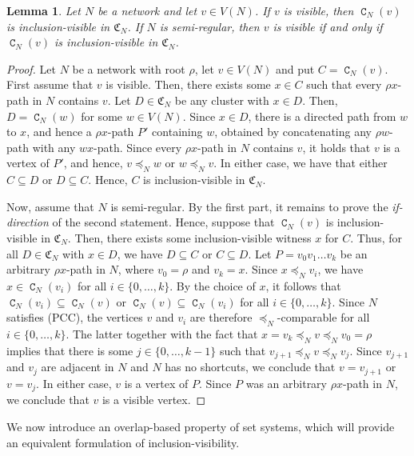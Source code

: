 \documentclass[preprint]{elsarticle}
\newtheorem{lemma}[theorem]{Lemma}
\newcommand{\CS}[1][]{\ensuremath{\mathfrak{C}_{#1}}}
\DeclareMathOperator{\CC}{\mathtt{C}}
\begin{document}
\begin{lemma}\label{lem:visible-semiregular}
    Let $N$ be a network and let $v\in V(N)$. If $v$ is visible, then
    $\CC_N(v)$ is inclusion-visible in $\CS[N]$. If $N$ is semi-regular, then $v$ is
    visible if and only if $\CC_N(v)$ is inclusion-visible in $\CS[N]$.
\end{lemma}
\begin{proof}
	Let $N$ be a network with root $\rho$, let $v\in V(N)$ and put $C=\CC_N(v)$. First assume that
	$v$ is visible.
	Then, there exists some $x\in C$ such that every $\rho x$-path in $N$ contains $v$. Let
	$D\in\CS[N]$ be any cluster with $x\in D$. Then, $D=\CC_N(w)$ for some $w\in V(N)$.
	Since $x\in D$, there is a
	directed path from $w$ to $x$, and hence a $\rho x$-path $P'$ containing $w$, obtained by
	concatenating any $\rho w$-path with any $wx$-path.
	Since every $\rho x$-path in $N$ contains $v$, it holds that $v$ is a vertex of $P'$, and
	hence, $v\preceq_N w$ or $w\preceq_N v$. In either case, we have that either $C\subseteq D$ or
	$D\subseteq C$. Hence, $C$ is inclusion-visible in $\CS[N]$.
	
	Now, assume that $N$ is semi-regular. By the first part, it remains to prove the
	\emph{if-direction} of the second statement.
 	Hence, suppose that $\CC_N(v)$ is inclusion-visible in $\CS[N]$. Then, there exists some
	inclusion-visible witness $x$ for $C$. Thus,
	for all $D\in\CS[N]$ with $x\in D$, we have $D\subseteq C$ or $C\subseteq D$.
	Let $P=v_0v_1\ldots v_k$ be an arbitrary $\rho x$-path in $N$, where $v_0=\rho$ and $v_k=x$.
	Since $x\preceq_N v_i$, we have  $x\in \CC_N(v_i)$ for all $i\in\{0,\ldots,k\}$. 
	By the choice of $x$, it follows that $\CC_N(v_i)\subseteq \CC_N(v)$ or
	$\CC_N(v)\subseteq \CC_N(v_i)$ for all $i\in\{0,\ldots,k\}$. Since $N$ satisfies 
	(PCC), the vertices $v$ and $v_i$ are therefore $\preceq_N$-comparable for all
	$i\in\{0,\ldots,k\}$. The latter together with the fact that $x=v_k\preceq_N v\preceq_N v_0=\rho$
	implies that there is some $j\in\{0,\ldots,k-1\}$ such that $v_{j+1}\preceq_N v\preceq_N v_j$.
	Since $v_{j+1}$ and $v_j$ are adjacent in $N$ and $N$ has no shortcuts, we conclude that
	$v=v_{j+1}$ or $v=v_j$. In either case, $v$ is a vertex of $P$. Since $P$ was an
	arbitrary $\rho x$-path in $N$, we conclude that $v$ is a visible vertex.
\end{proof}

We now introduce an overlap-based property of set systems, which will provide an equivalent
formulation of inclusion-visibility.
\end{document}

